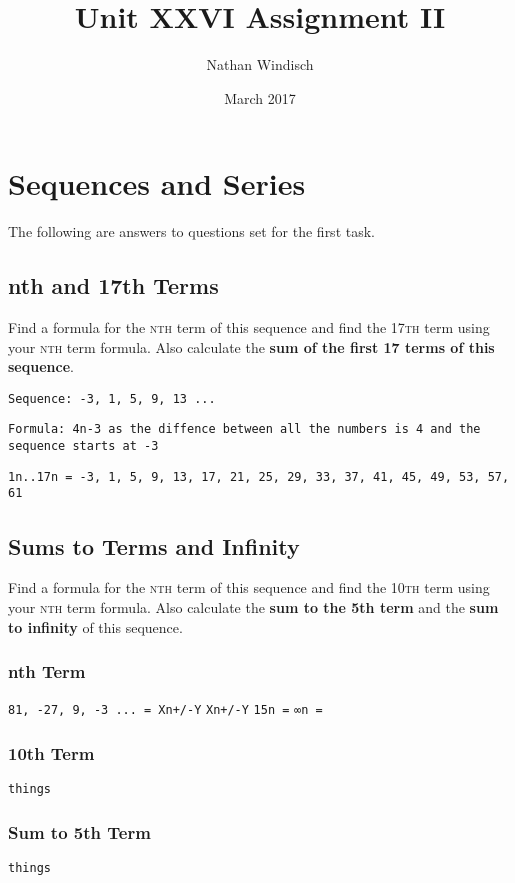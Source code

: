 \documentclass[a4paper,12pt]{article}
\begin{document}
\title{Unit XXVI Assignment II}
\author{Nathan Windisch}
\date{March 2017}
\maketitle
{}
\tableofcontents
\newpage
{}

\section{Sequences and Series}
The following are answers to questions set for the first task.
\subsection{nth and 17th Terms}
Find a formula for the \textsc{nth} term of this sequence and find the \textsc{17th} term using your \textsc{nth} term formula. Also calculate the \textbf{sum of the first 17 terms of this sequence}.

\texttt{Sequence: -3, 1, 5, 9, 13 ...}

\texttt{Formula: 4n-3 as the diffence between all the numbers is 4 and the sequence starts at -3}

\texttt{1n..17n = -3, 1, 5, 9, 13, 17, 21, 25, 29, 33, 37, 41, 45, 49, 53, 57, 61}

\newpage

\subsection{Sums to Terms and Infinity}
Find a formula for the \textsc{nth} term of this sequence and find the \textsc{10th} term using your \textsc{nth} term formula. Also calculate the \textbf{sum to the 5th term} and the \textbf{sum to infinity} of this sequence.

\subsubsection{nth Term}
\texttt{81, -27, 9, -3 ... = Xn+/-Y}
\texttt{Xn+/-Y}
\texttt{15n =}
\texttt{∞n =}

\subsubsection{10th Term}
\texttt{things}

\subsubsection{Sum to 5th Term}
\texttt{things}
\end{document}
